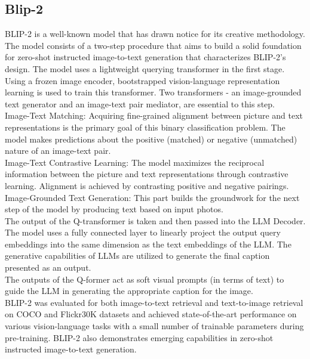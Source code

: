 \documentclass[conference]{IEEEtran}
\begin{document}
\subsection{Blip-2}
{
BLIP-2 \cite{li2023blip} is a well-known model that has drawn notice for its creative methodology. The model consists of a two-step procedure that aims to build a solid foundation for zero-shot instructed image-to-text generation that characterizes BLIP-2's design. The model uses a lightweight querying transformer in the first stage. Using a frozen image encoder, bootstrapped vision-language representation learning is used to train this transformer. Two transformers - an image-grounded text generator and an image-text pair mediator, are essential to this step.
\\

Image-Text Matching: Acquiring fine-grained alignment between picture and text representations is the primary goal of this binary classification problem. The model makes predictions about the positive (matched) or negative (unmatched) nature of an image-text pair.
\\

Image-Text Contrastive Learning: The model maximizes the reciprocal information between the picture and text representations through contrastive learning. Alignment is achieved by contrasting positive and negative pairings.
\\

Image-Grounded Text Generation: This part builds the groundwork for the next step of the model by producing text based on input photos.
\\

The output of the Q-transformer is taken and then passed into the LLM Decoder. The model uses a fully connected layer to linearly project the output query embeddings into the same dimension as the text embeddings of the LLM. The generative capabilities of LLMs are utilized to generate the final caption presented as an output.
\\

The outputs of the Q-former act as soft visual prompts (in terms of text) to guide the LLM in generating the appropriate caption for the image.
\\

BLIP-2 was evaluated for both image-to-text retrieval and text-to-image retrieval on COCO and Flickr30K datasets and achieved state-of-the-art performance on various vision-language tasks with a small number of trainable parameters during pre-training. BLIP-2 also demonstrates emerging capabilities in zero-shot instructed image-to-text generation.
}
\end{document}
